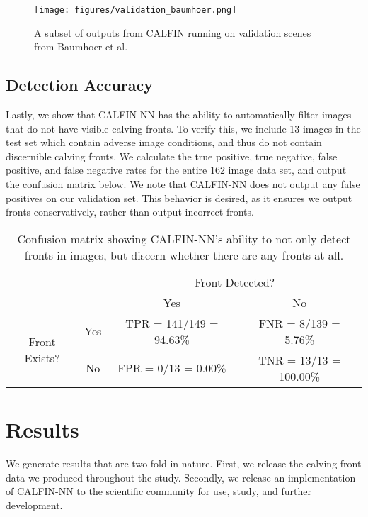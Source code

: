 \documentclass[tc, manuscript]{copernicus}
\begin{document}
\begin{figure}[H]
    \texttt{[image: figures/validation\_baumhoer.png]}
    \centering
    \caption{A subset of outputs from CALFIN running on validation scenes from Baumhoer et al.}
    \label{fig:baumhoer}
\end{figure}

\setlength{\intextsep}{12.0pt plus 2.0pt minus 2.0pt}


\subsection{Detection Accuracy}
\label{sec:accuracy}
Lastly, we show that CALFIN-NN has the ability to automatically filter images that do not have visible calving fronts. To verify this, we include 13 images in the test set which contain adverse image conditions, and thus do not contain discernible calving fronts. We calculate the true positive, true negative, false positive, and false negative rates for the entire 162 image data set, and output the confusion matrix below. We note that CALFIN-NN does not output any false positives on our validation set. This behavior is desired, as it ensures we output fronts conservatively, rather than output incorrect fronts.

\begin{table}[h]
	\centering
	\caption{Confusion matrix showing CALFIN-NN's ability to not only detect fronts in images, but discern whether there are any fronts at all.}
	\label{confusion-matrix}
	\begin{tabular}{c|c|c|c|}
		\multicolumn{1}{c}{} & \multicolumn{1}{c}{} &  \multicolumn{2}{c}{Front Detected?} \\ 
		\cline{3-4}
		\multicolumn{1}{c}{} &  & \rowcolor[rgb]{0.71,0.71,0.71} Yes & No \\ 
		\cline{2-4}
		\multirow{2}{*}{Front Exists?} & \cellcolor[rgb]{0.71,0.71,0.71} Yes & TPR = 141/149 = 94.63\% & FNR = 8/139 = 5.76\% \\ 
		\cline{2-4}
		& \cellcolor[rgb]{0.71,0.71,0.71} No & FPR = 0/13 = 0.00\% & TNR = 13/13 = 100.00\% \\
		\cline{2-4}
	\end{tabular}
	\label{tab:confusion_matrix}
\end{table}

\section{Results}
\label{sec:results}
We generate results that are two-fold in nature. First, we release the calving front data we produced throughout the study. Secondly, we release an implementation of CALFIN-NN to the scientific community for use, study, and further development.
\end{document}
